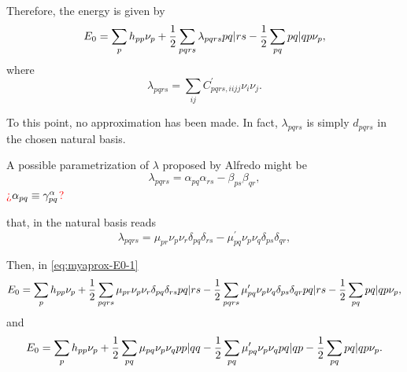 Therefore, the energy is given by
\begin{equation} \label{eq:myaprox-E0-1}
    E_0 =
    \sum_{p} h_{pp} \nu_p +
    \frac{1}{2} \sum_{pqrs} \lambda_{pqrs} \PBraket{pq | rs}
    - 
    \frac{1}{2} \sum_{pq} \PBraket{pq | qp} \nu_p
    ,
\end{equation}
where 
\begin{equation}
    \lambda_{pqrs} = \sum_{ij} 
    C_{pqrs,iijj}^{\prime} \nu_i \nu_j
    .
\end{equation}

To this point, no approximation has been made. 
In fact, $\lambda_{pqrs}$ is simply $d_{pqrs}$ in the chosen natural basis.

A possible parametrization of $\lambda$ proposed by Alfredo might be 
\begin{equation}
    \lambda_{pqrs} =
    \alpha_{pq} \alpha_{rs}
    -
    \beta_{ps} \beta_{qr}
    ,
\end{equation}
\textcolor{red}{¿$\alpha_{pq} \equiv \gamma_{pq}^{\alpha}$?}

that, in the natural basis reads
\begin{equation}
    \lambda_{pqrs} =
    \mu_{pr} \nu_p \nu_r \delta_{pq} \delta_{rs}
    -
    \mu_{pq}^{\prime} \nu_p \nu_q \delta_{ps} \delta_{qr}
    ,
\end{equation}

Then, in \cref{eq:myaprox-E0-1}
\begin{equation}
    E_0 =
    \sum_{p} h_{pp} \nu_p +
    \frac{1}{2} \sum_{pqrs} 
    \mu_{pr} \nu_p \nu_r \delta_{pq} \delta_{rs}
    \PBraket{pq | rs}
    -
    \frac{1}{2} \sum_{pqrs} 
    \mu_{pq}^{\prime} \nu_p \nu_q \delta_{ps} \delta_{qr}
    \PBraket{pq | rs}
    -
    \frac{1}{2} \sum_{pq} \PBraket{pq | qp} \nu_p
    ,
\end{equation}
and
\begin{equation}
    E_0 =
    \sum_{p} h_{pp} \nu_p +
    \frac{1}{2} \sum_{pq} 
    \mu_{pq} \nu_p \nu_q 
    \PBraket{pp | qq}
    -
    \frac{1}{2} \sum_{pq} 
    \mu_{pq}^{\prime} \nu_p \nu_q
    \PBraket{pq | qp}
    -
    \frac{1}{2} \sum_{pq} \PBraket{pq | qp} \nu_p
    .
\end{equation}

